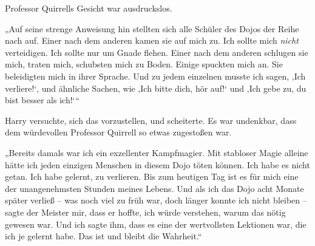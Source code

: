 Professor Quirrells Gesicht war ausdruckslos.

„Auf seine strenge Anweisung hin stellten sich alle Schüler des Dojos der Reihe nach auf. Einer nach dem anderen kamen sie auf mich zu. Ich sollte mich \emph{nicht} verteidigen. Ich sollte nur um Gnade flehen. Einer nach dem anderen schlugen sie mich, traten mich, schubsten mich zu Boden. Einige spuckten mich an. Sie beleidigten mich in ihrer Sprache. Und zu jedem einzelnen musste ich sagen, ‚Ich verliere!‘, und ähnliche Sachen, wie ‚Ich bitte dich, hör auf!‘ und ‚Ich gebe zu, du bist besser als ich!‘“

Harry versuchte, sich das vorzustellen, und scheiterte. Es war undenkbar, dass dem würdevollen Professor Quirrell so etwas zugestoßen war.

„Bereits damals war ich ein exzellenter Kampfmagier. Mit stabloser Magie alleine hätte ich jeden einzigen Menschen in diesem Dojo töten können. Ich habe es nicht getan. Ich habe gelernt, zu verlieren. Bis zum heutigen Tag ist es für mich eine der unangenehmsten Stunden meines Lebens. Und als ich das Dojo acht Monate später verließ – was noch viel zu früh war, doch länger konnte ich nicht bleiben – sagte der Meister mir, dass er hoffte, ich würde verstehen, warum das nötig gewesen war. Und ich sagte ihm, dass es eine der wertvollsten Lektionen war, die ich je gelernt habe. Das ist und bleibt die Wahrheit.“

